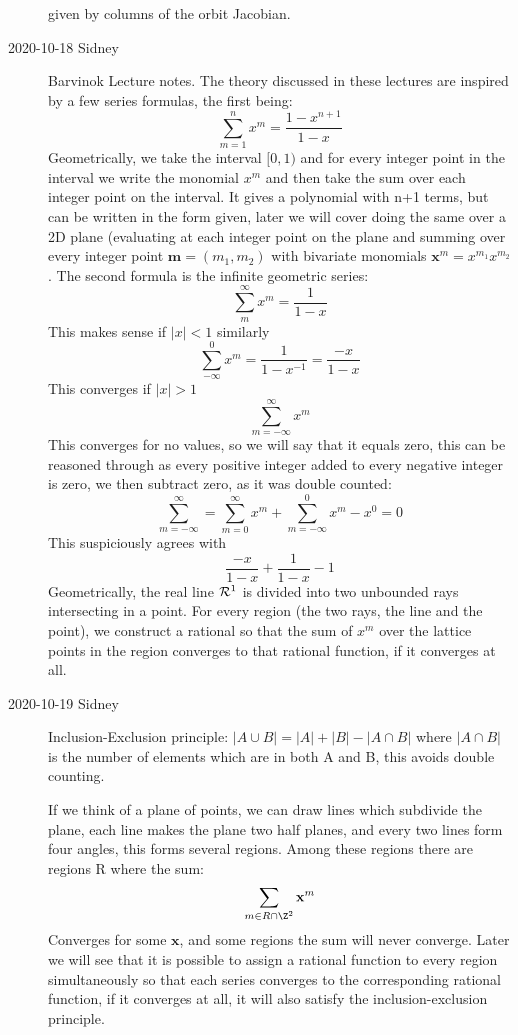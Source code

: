 \begin{description}
given by columns of the orbit Jacobian. 


\item[2020-10-18 Sidney]

Barvinok Lecture notes. The theory discussed in these lectures are inspired by a few series formulas, the first being:
$$\sum^n_{m=1}x^m=\frac{1-x^{n+1}}{1-x}$$
Geometrically, we take the interval $[0,1)$ and for every integer point in the interval we write the monomial $x^m$ and then take the sum over each integer point on the interval. It gives a polynomial with n+1 terms, but can be written in the form given, later we will cover doing the same over a 2D plane (evaluating at each integer point on the plane and summing over every integer point $\textbf{m}=(m_1,m_2)$ with bivariate monomials $\textbf{x}^m=x^{m_1}x^{m_2}$. The second formula is the infinite geometric series:
$$\sum^{\infty}_{m}x^m=\frac{1}{1-x}$$ 
This makes sense if $|x|<1$ similarly 
$$\sum^0_{-\infty}x^m=\frac{1}{1-x^{-1}}=\frac{-x}{1-x}$$
This converges if $|x|>1$
$$\sum^{\infty}_{m=-\infty}x^m$$
This converges for no values, so we will say that it equals zero, this can be reasoned through as every positive integer added to every negative integer is zero, we then subtract zero, as it was double counted:
$$\sum^{\infty}_{m=-\infty}=\sum^{\infty}_{m=0}x^m+\sum^{0}_{m=-\infty}x^m-x^0=0$$
This suspiciously agrees with
$$\frac{-x}{1-x}+\frac{1}{1-x}-1$$
Geometrically, the real line $\mathcal{R}^1$ is divided into two unbounded rays intersecting in a point. For every region (the two rays, the line and the point), we construct a rational so that the sum of $x^m$ over the lattice points in the region converges to that rational function, if it converges at all.

\item[2020-10-19 Sidney]

Inclusion-Exclusion principle: $|A\cup B|=|A|+|B|-|A\cap B|$ where $|A\cap B|$ is the number of elements which are in both A and B, this avoids double counting.

If we think of a plane of points, we can draw lines which subdivide the plane, each line makes the plane two half planes, and every two lines form four angles, this forms several regions. Among these regions there are regions R where the sum:
$$\sum_{m\in R\cap \Z^2}\textbf{x}^m$$
Converges for some $\textbf{x}$, and some regions the sum will never converge. Later we will see that it is possible to assign a rational function to every region simultaneously so that each series converges to the corresponding rational function, if it converges at all, it will also satisfy the inclusion-exclusion principle.


\end{description}
